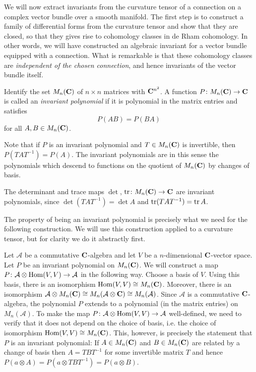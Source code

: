 \documentclass[a4paper,openany]{scrbook}
\begin{document}
We will now extract invariants from the curvature tensor of a connection on a complex vector bundle over a smooth manifold. The first step is to construct a family of differential forms from the curvature tensor and show that they are closed, so that they gives rise to cohomology classes in de Rham cohomology. In other words, we will have constructed an algebraic invariant for a vector bundle equipped with a connection. What is remarkable is that these cohomology classes are \emph{independent of the chosen connection}, and hence invariants of the vector bundle itself.
\begin{defn}
Identify the set $M_n(\mathbf C)$ of $n \times n$ matrices with $\mathbf C^{n^2}$. A function $P \colon M_n(\mathbf C) \to \mathbf C$ is called an \emph{invariant polynomial} if it is polynomial in the matrix entries and satisfies
\[P(AB) = P(BA)\]
for all $A, B \in M_n(\mathbf C)$.
\end{defn}
Note that if $P$ is an invariant polynomial and $T \in M_n(\mathbf C)$ is invertible, then $P(TAT^{-1}) = P(A)$. The invariant polynomials are in this sense the polynomials which descend to functions on the quotient of $M_n(\mathbf C)$ by changes of basis.

\begin{example}
The determinant and trace maps $\det$, $\operatorname{tr} \colon M_n(\mathbf C) \to \mathbf C$ are invariant polynomials, since $\det(TAT^{-1}) = \det A$ and $\operatorname{tr}(TAT^{-1}) = \operatorname{tr} A$.
\end{example}

The property of being an invariant polynomial is precisely what we need for the following construction. We will use this construction applied to a curvature tensor, but for clarity we do it abstractly first.

\begin{construction}
Let $\mathcal A$ be a commutative $\mathbf C$-algebra and let $V$ be a $n$-dimensional $\mathbf C$-vector space. Let $P$ be an invariant polynomial on $M_n(\mathbf C)$. We will construct a map $P \colon \mathcal A \otimes \operatorname{Hom}(V, V) \to \mathcal A$ in the following way. Choose a basis of $V$. Using this basis, there is an isomorphism $\operatorname{Hom}(V, V) \cong M_n(\mathbf C)$. Moreover, there is an isomorphism $\mathcal A \otimes M_n(\mathbf C) \cong M_n(\mathcal A \otimes \mathbf C) \cong M_n(\mathcal A)$. Since $\mathcal A$ is a commutative $\mathbf C$-algebra, the polynomial $P$ extends to a polynomial (in the matrix entries) on $M_n(\mathcal A)$. To make the map $P \colon \mathcal A \otimes \operatorname{Hom}(V, V) \to \mathcal A$ well-defined, we need to verify that it does not depend on the choice of basis, i.e. the choice of isomorphism $\operatorname{Hom}(V, V) \cong M_n(\mathbf C)$. This, however, is precisely the statement that $P$ is an invariant polynomial: If $A \in M_n(\mathbf C)$ and $B \in M_n(\mathbf C)$ are related by a change of basis then $A = TBT^{-1}$ for some invertible matrix $T$ and hence $P(a \otimes A) = P(a \otimes TBT^{-1}) = P(a \otimes B)$.
\end{construction}
\end{document}

